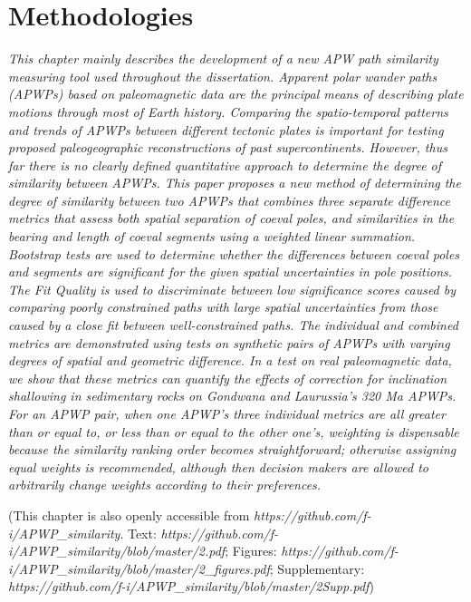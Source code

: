 \chapter{Methodologies}\label{chap:Metho}
\textit{This chapter mainly describes the development of a new APW path
similarity measuring tool used throughout the dissertation.
Apparent polar wander paths (APWPs) based on paleomagnetic data are the
principal means of describing plate motions through most of Earth history.
Comparing the spatio-temporal patterns and trends of APWPs between different
tectonic plates is important for testing proposed paleogeographic
reconstructions of past supercontinents. However, thus far there is no clearly
defined quantitative approach to determine the degree of similarity between
APWPs. This paper proposes a new method of determining the degree of similarity
between two APWPs that combines three separate difference metrics that assess
both spatial separation of coeval poles, and similarities in the bearing and
length of coeval segments using a weighted linear summation. Bootstrap tests are
used to determine whether the differences between coeval poles and segments are
significant for the given spatial uncertainties in pole positions. The Fit
Quality is used to discriminate between low significance scores caused by
comparing poorly constrained paths with large spatial uncertainties from those
caused by a close fit between well-constrained paths. The individual and
combined metrics are demonstrated using tests on synthetic pairs of APWPs with
varying degrees of spatial and geometric difference. In a test on real
paleomagnetic data, we show that these metrics can quantify the effects of
correction for inclination shallowing in sedimentary rocks on Gondwana and
Laurussia's 320 Ma APWPs. For an APWP pair, when one APWP's three
individual metrics are all greater than or equal to, or less than or equal to
the other one's, weighting is dispensable because the similarity ranking order
becomes straightforward; otherwise assigning equal weights is recommended,
although then decision makers are allowed to arbitrarily change weights
according to their preferences.}
\vfill
\minitoc\newpage

(This chapter is also openly accessible from
\emph{https://github.com/f-i/APWP\_similarity}. Text:
\emph{https://github.com/f-i/APWP\_similarity/blob/master/2.pdf}; Figures:
\emph{https://github.com/f-i/APWP\_similarity/blob/master/2\_figures.pdf};
Supplementary:
\emph{https://github.com/f-i/APWP\_similarity/blob/master/2Supp.pdf})


